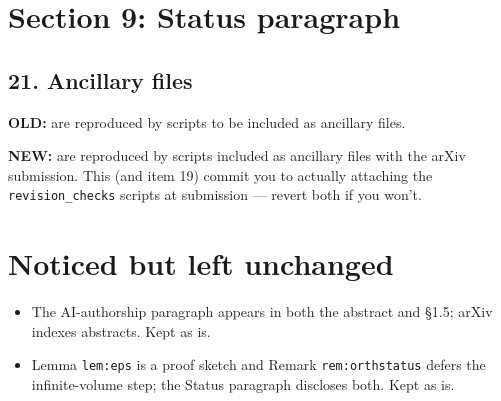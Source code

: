 \documentclass[11pt]{article}
\newenvironment{old}{\par\noindent\textcolor{oldred}{\textbf{OLD:}}\small\color{oldred}\verbatim}{\endverbatim\normalsize\color{black}}
\newenvironment{new}{\par\noindent\textcolor{newgreen}{\textbf{NEW:}}\small\color{newgreen}\verbatim}{\endverbatim\normalsize\color{black}}
\begin{document}
\section*{Section 9: Status paragraph}

\subsection*{21. Ancillary files}
\begin{old}
are reproduced by scripts to be included as ancillary files.
\end{old}
\begin{new}
are reproduced by scripts included as ancillary files with the arXiv submission.
\end{new}
This (and item 19) commit you to actually attaching the
\texttt{revision\_checks} scripts at submission --- revert both if you won't.

\section*{Noticed but left unchanged}
\begin{itemize}
\item The AI-authorship paragraph appears in both the abstract and \S1.5;
arXiv indexes abstracts. Kept as is.
\item Lemma \texttt{lem:eps} is a proof sketch and Remark \texttt{rem:orthstatus}
defers the infinite-volume step; the Status paragraph discloses both. Kept as is.
\end{itemize}
\end{document}
